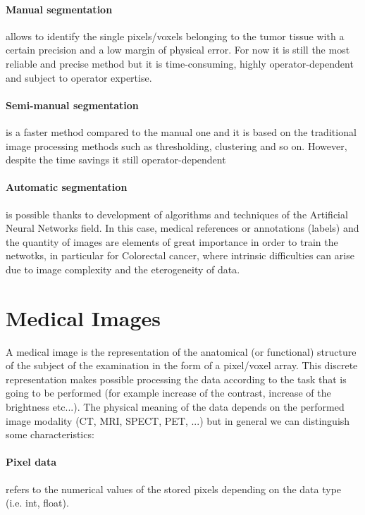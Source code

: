 \documentclass[12pt,a4paper]{report}
\begin{document}
\paragraph{Manual segmentation} allows to identify the single pixels/voxels belonging to the tumor tissue with a certain precision and a low margin of physical error. For now it is still the most reliable and precise method but
it is time-consuming, highly operator-dependent and subject to operator expertise\cite{tesicoppola}.

\paragraph{Semi-manual segmentation} is a faster method compared to the manual one and it is based on the traditional image processing methods such as thresholding, clustering and so on. However, despite the time savings it still operator-dependent\cite{tesicoppola}

\paragraph{Automatic segmentation} is possible thanks to development of algorithms and techniques of the Artificial Neural Networks field. In this case, medical references or annotations (labels) and the quantity of images are elements of great importance in order to train the netwotks, in particular for Colorectal cancer, where intrinsic difficulties can arise due to image complexity and the eterogeneity of data\cite{tesicoppola,Trebeschi2017}.


\section{Medical Images}

A medical image is the representation of the anatomical (or functional) structure of the subject of the examination in the form of a pixel/voxel array\cite{Biondi,Larobina}. This discrete representation makes possible processing the data according to the task that is going to be performed (for example increase of the contrast, increase of the brightness etc...). The physical meaning of the data depends on the performed image modality (CT, MRI, SPECT, PET, ...) but in general we can distinguish some characteristics:

\paragraph{Pixel data} refers to the numerical values of the stored pixels depending on the data type (i.e. int, float)\cite{Biondi,Larobina}.
\end{document}

